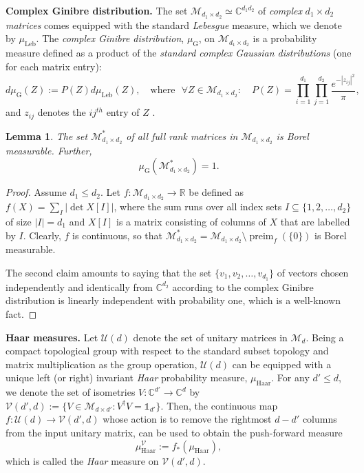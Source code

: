 \documentclass[a4paper,onecolumn,10pt,accepted=2022-07-11]{quantumarticle}
\newcommand{\M}[1]{\mathcal{M}_{#1}}
\newcommand{\C}[1]{\mathbb{C}^{#1}}
\newcommand{\leb}{\operatorname{Leb}}
\newcommand{\gin}{\operatorname{G}}
\newtheorem{lemma}[theorem]{Lemma}
\theoremstyle{definition}
\newcommand{\iden}{\mathbb{1}}
\begin{document}
\smallskip

\noindent\textbf{Complex Ginibre distribution.} The set $\M{d_1\times d_2}\simeq \C{d_1 d_2}$ of \emph{complex} $d_1\times d_2$ \emph{matrices} comes equipped with the standard \emph{Lebesgue} measure, which we denote by $\mu_{\leb}$. The \emph{complex Ginibre distribution}, $\mu_{\gin}$, on $\M{d_1\times d_2}$ is a probability measure defined as a product of the \emph{standard complex Gaussian distributions} (one for each matrix entry): 
\begin{equation}\label{eq:gin}
    d\mu_{\gin}(Z) := P(Z)d\mu_{\leb}(Z), \quad \text{where }\,\, \forall Z \in  \M{d_1 \times d_2}: \quad P(Z) = \prod_{i=1}^{d_1} \prod_{j=1}^{d_2} \frac{e^{-|z_{ij}|^2}}{\pi},
\end{equation}
and $z_{ij}$ denotes the $ij^{th}$ entry of $Z$ \cite{Ginibre1965}.


\begin{lemma}\label{lemma:gin<leb}
The set $\mathcal{M}^*_{d_1\times d_2}$ of all full rank matrices in $\M{d_1\times d_2}$ is Borel measurable. Further,       
$$\mu_{\gin}(\mathcal{M}^*_{d_1\times d_2})=1.$$
\end{lemma} 
\begin{proof}
Assume $d_1\leq d_2$. Let $f:\M{d_1\times d_2}\to \mathbb{R}$ be defined as $f(X) = \sum_I |\det X[I]|$, where the sum runs over all index sets $I\subseteq \{1,2,\ldots ,d_2\}$ of size $|I|=d_1$ and $X[I]$ is a matrix consisting of columns of $X$ that are labelled by $I$. Clearly, $f$ is continuous, so that $\mathcal{M}^*_{d_1\times d_2}=\M{d_1\times d_2} \setminus \operatorname{preim}_f(\{0\})$ is Borel measurable. 

The second claim amounts to saying that the set $\{v_1,v_2,\ldots ,v_{d_1}\}$ of vectors chosen independently and identically from $\C{d_2}$ according to the complex Ginibre distribution is linearly independent with probability one, which is a well-known fact.
\end{proof}


\noindent\textbf{Haar measures.} Let $\mathcal{U}(d)$ denote the set of unitary matrices in $\M{d}$. Being a compact topological group with respect to the standard subset topology and matrix multiplication as the group operation, $\mathcal{U}(d)$ can be equipped with a unique left (or right) invariant \emph{Haar} probability measure, $\mu_{\operatorname{Haar}}$. For any $d'\leq d$, we denote the set of isometries $V:\C{d'}\to\C{d}$ by $\mathcal{V}(d',d):=\{V\in \M{d\times d'}: V^\dagger V=\iden_{d'}\}$. Then, the continuous map $f:\mathcal{U}(d)\to \mathcal{V}(d',d)$ whose action is to remove the rightmost $d-d'$ columns from the input unitary matrix, can be used to obtain the push-forward measure 
\begin{equation}\label{eq:Vhaar1}
\mu^{\mathcal{V}}_{\operatorname{Haar}} :=f_*(\mu_{\operatorname{Haar}}),    
\end{equation}
which is called the \emph{Haar} measure on $\mathcal{V}(d',d)$. 
\end{document}
